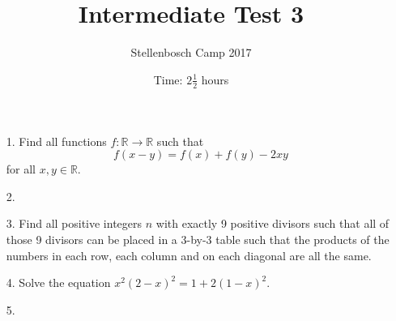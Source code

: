 \documentclass[12pt]{article}
\title{Intermediate Test 3}
\author{Stellenbosch Camp 2017}
\date{Time: $2\frac{1}{2}$ hours}
\begin{document}
 \maketitle

\begin{enumerate}

\item[1.]  
Find all functions $f:\mathbb{R} \rightarrow \mathbb{R}$ such that
    $$ f(x-y)=f(x)+f(y)-2xy $$
    for all $x, y \in \mathbb{R}$.


\item[2.] %


\item[3.] %
Find all positive integers $n$ with exactly 9 positive divisors such that all of those 9 divisors can be placed in a 3-by-3 table such that the products of the numbers in each row, each column and on each diagonal are all the same.


\item[4.] %
Solve the equation $x^2(2-x)^2 = 1 + 2(1-x)^2$.


\item[5.] %


\end{enumerate}
\end{document}
